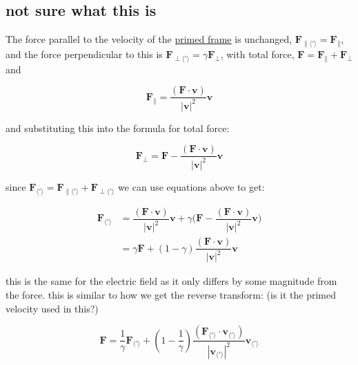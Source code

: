 \subsection{not sure what this is}

The force parallel to the velocity of the \hyperlink{def-Primed-Frame}{primed frame} is unchanged, $\mathbf{F}_{\parallel \langle ' \rangle} =\mathbf{F}_{\parallel}$, and the force perpendicular to this is $\mathbf{F}_{\perp \langle ' \rangle} =\gamma \mathbf{F}_{\perp}$, with total force, $\mathbf{F}=\mathbf{F}_{\parallel}+\mathbf{F}_{\perp}$ and

\begin{equation}
	\mathbf{F}_{\parallel} = \dfrac{(\mathbf{F}\cdot\mathbf{v})}{|\mathbf{v}|^2}\mathbf{v}
\end{equation}

and substituting this into the formula for total force:

\begin{equation}
	\mathbf{F}_{\perp} = \mathbf{F}-\dfrac{(\mathbf{F}\cdot\mathbf{v})}{|\mathbf{v}|^2}\mathbf{v}
\end{equation}

since $\mathbf{F}_{\langle ' \rangle} =\mathbf{F}_{\parallel \langle ' \rangle} +\mathbf{F}_{\perp\langle ' \rangle}$ we can use equations above to get:

\begin{equation}
	\begin{split}
		\mathbf{F}_{\langle ' \rangle} & = \dfrac{(\mathbf{F}\cdot\mathbf{v})}{|\mathbf{v}|^2}\mathbf{v} + \gamma\bigg(\mathbf{F}-\dfrac{(\mathbf{F}\cdot\mathbf{v})}{|\mathbf{v}|^2}\mathbf{v}\bigg) \\
		                               & = \gamma\mathbf{F} + (1-\gamma)\dfrac{(\mathbf{F}\cdot\mathbf{v})}{|\mathbf{v}|^2}\mathbf{v}
	\end{split}
\end{equation}

this is the same for the electric field as it only differs by some magnitude from the force.\newline
this is similar to how we get the reverse transform: (is it the primed velocity used in this?)

\begin{equation}
	\mathbf{F} = \dfrac{1}{\gamma}\mathbf{F}_{\langle ' \rangle}  + (1-\dfrac{1}{\gamma})\dfrac{(\mathbf{F}_{\langle ' \rangle} \cdot\mathbf{v}_{\langle ' \rangle} )}{|\mathbf{v}_{\langle ' \rangle} |^2}\mathbf{v}_{\langle ' \rangle}
\end{equation}

